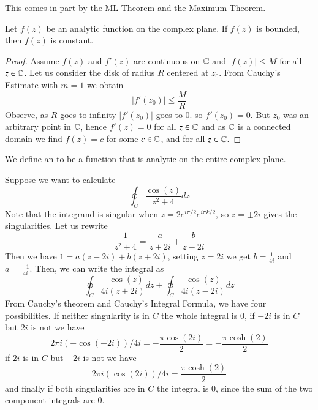This comes in part by the ML Theorem and the Maximum Theorem.

\begin{theorem}
    Let $f(z)$ be an analytic function on the complex plane. If $f(z)$ is bounded, then $f(z)$ is constant.
\end{theorem}
\begin{proof}
    Assume $f(z)$ and $f'(z)$ are continuous on $\mathbb C$ and $|f(z)| \leq M$ for all $z \in \mathbb C$. Let us consider the disk of radius $R$ centered at $z_0$. From Cauchy's Estimate with $m = 1$ we obtain \begin{equation*}
        |f'(z_0)| \leq \frac{M}{R}
    \end{equation*}
    Observe, as $R$ goes to infinity $|f'(z_0)|$ goes to $0$. so $f'(z_0) = 0$. But $z_0$ was an arbitrary point in $\mathbb C$, hence $f'(z) = 0$ for all $z \in \mathbb C$ and as $\mathbb C$ is a connected domain we find $f(z) = c$ for some $c \in \mathbb C$, and for all $z \in \mathbb C$.
\end{proof}

\begin{definition}
    We define an  to be a function that is analytic on the entire complex plane.
\end{definition}


\begin{example}
    Suppose we want to calculate \begin{equation*}
        \oint_C\frac{\cos(z)}{z^2+4}dz
    \end{equation*}
    Note that the integrand is singular when $z= 2e^{i \pi/2}e^{i\pi k/2}$, so $z = \pm 2i$ gives the singularities. Let us rewrite \begin{equation*}
        \frac{1}{z^2+4} = \frac{a}{z+2i}+\frac{b}{z-2i} 
    \end{equation*}
    Then we have $1 = a(z-2i)+b(z+2i)$, setting $z = 2i$ we get $b = \frac{1}{4i}$ and $a = \frac{-1}{4i}$. Then, we can write the integral as \begin{equation*}
        \oint_C\frac{-\cos(z)}{4i(z+2i)}dz + \oint_C\frac{\cos(z)}{4i(z-2i)}dz
    \end{equation*}
    From Cauchy's theorem and Cauchy's Integral Formula, we have four possibilities. If neither singularity is in $C$ the whole integral is $0$, if $-2i$ is in $C$ but $2i$ is not we have $$2\pi i(-\cos(-2i))/4i = -\frac{\pi\cos(2i)}{2} = -\frac{\pi\cosh(2)}{2}$$ if $2i$ is in $C$ but $-2i$ is not we have \begin{equation*}
        2\pi i(\cos(2i))/4i = \frac{\pi\cosh(2)}{2}
    \end{equation*}
    and finally if both singularities are in $C$ the integral is $0$, since the sum of the two component integrals are $0$.
\end{example}



